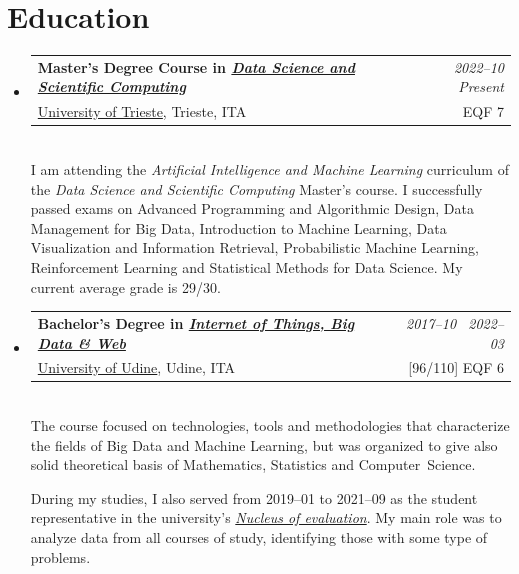 \documentclass[a4paper,english]{article} %
\makeatletter
\newcommand{\resumeSubheading}[4]{
  \vspace{2pt}\item
    \begin{tabular*}{0.97\textwidth}{l@{\extracolsep{\fill}}r}
      \textbf{#1} & \textit{\small #2} \\
      #3 & \small #4 \\
    \end{tabular*}\vspace{5pt}\\
}
\makeatother
\begin{document}
\section{Education}

	\begin{itemize}[leftmargin=*]

		\resumeSubheading
			{Master's Degree Course in \href{https://dssc.units.it/}{\textit{Data Science and Scientific Computing}}}{2022--10 \textrightarrow~Present}
			{\href{https://www.units.it/en/}{University of Trieste}, Trieste, ITA}{EQF 7}
			I am attending the \textit{Artificial Intelligence and Machine Learning} curriculum of the \textit{Data Science and Scientific Computing} Master's course. I successfully passed exams on Advanced Programming and Algorithmic Design, Data Management for Big Data, Introduction to Machine Learning, Data Visualization and Information Retrieval, Probabilistic Machine Learning, Reinforcement Learning and Statistical Methods for Data Science. My current average grade is 29/30.

		\resumeSubheading
			{Bachelor's Degree in \href{https://www.uniud.it/en/education/offer/courses/scientific-area/mathematics-computer-sciences-multimedia-physics/bachelor-degree-courses-undergraduate-180-ects/internet-of-things-big-data-machine-learning?set_language=en}{\textit{Internet of Things, Big Data \& Web}}}{2017--10 \textrightarrow~2022--03}
			{\href{https://www.uniud.it/en/uniud-international?set_language=en/}{University of Udine}, Udine, ITA}{[96/110] EQF 6}
			The course focused on technologies, tools and methodologies that characterize the fields of Big Data and Machine Learning,
			but was organized to give also solid theoretical basis of Mathematics, Statistics and Computer~Science.


		 	During my studies, I also served from 2019--01 to 2021--09 as the student representative %
			in the university's \href{https://nuva.uniud.it/funzioni/il-personale/001-digitale-nucleo-di-valutazione-modifica.pdf}{\textit{Nucleus of evaluation}}. %
			My main role was to analyze data from all courses of study, identifying those with some type of problems.


\end{itemize}
\end{document}
